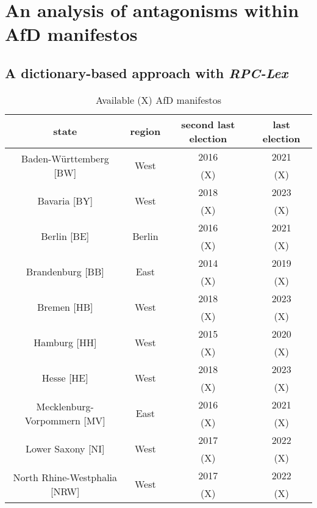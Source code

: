\documentclass[a4paper]{scrreprt}
\begin{document}
\chapter{An analysis of antagonisms within AfD manifestos}
\section{A dictionary-based approach with \em RPC-Lex}
\begin{table}\begin{center}
\caption{Available (X) AfD manifestos}
\begin{tabular}{c c c c} 
    \hline
    state & region & second last election & last election \\ [0.5ex]
    \hline\hline
    \multirow{2}{*}{Baden-Württemberg [BW]} & \multirow{2}{*}{West} & 2016 & 2021 \\ && (X) & (X) \\
    \hline
    \multirow{2}{*}{Bavaria [BY]} & \multirow{2}{*}{West} & 2018 & 2023 \\ && (X) & (X) \\
    \hline
    \multirow{2}{*}{Berlin [BE]} & \multirow{2}{*}{Berlin} & 2016 & 2021 \\ && (X) & (X) \\
    \hline
    \multirow{2}{*}{Brandenburg [BB]} & \multirow{2}{*}{East} & 2014 & 2019 \\ && (X) & (X) \\
    \hline
    \multirow{2}{*}{Bremen [HB]} & \multirow{2}{*}{West} & 2018 & 2023 \\ && (X) & (X) \\
    \hline
    \multirow{2}{*}{Hamburg [HH]} & \multirow{2}{*}{West} & 2015 & 2020 \\ && (X) & (X) \\
    \hline
    \multirow{2}{*}{Hesse [HE]} & \multirow{2}{*}{West} & 2018 & 2023 \\ && (X) & (X) \\
    \hline
    \multirow{2}{*}{Mecklenburg-Vorpommern [MV]} & \multirow{2}{*}{East} & 2016 & 2021 \\ && (X) & (X) \\
    \hline
    \multirow{2}{*}{Lower Saxony [NI]} & \multirow{2}{*}{West} & 2017 & 2022 \\ && (X) & (X) \\
    \hline
    \multirow{2}{*}{North Rhine-Westphalia [NRW]} & \multirow{2}{*}{West} & 2017 & 2022 \\ && (X) & (X) \\

\end{tabular}
\end{center}
\end{table}
\end{document}
